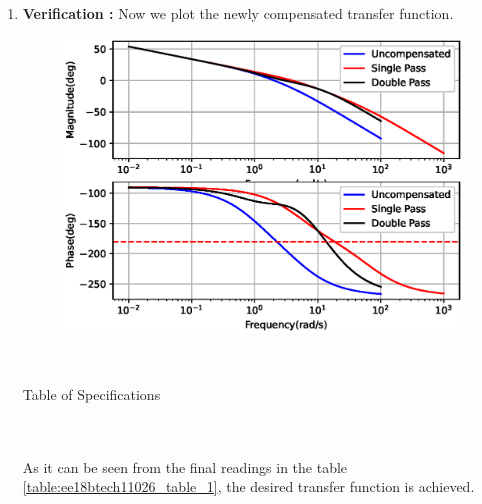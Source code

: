 \begin{enumerate}[label=\thesection.\arabic*.,ref=\thesection.\theenumi]
\item
\textbf{Verification : }
Now we plot the newly compensated transfer function.\\

\begin{figure}[!ht]
    \centering
    \includegraphics[width=\columnwidth]{./figs/ee18btech11051/ee18btech11051_fig3.eps}
    \label{fig:ee18btech11051_3}
\end{figure}

\\

\begin{table}[!ht]
\centering

\caption{Table of Specifications}
\label{table:ee18btech11026_table_1}
\end{table}
\\~\\

As it can be seen from the final readings in the table \ref{table:ee18btech11026_table_1}, the desired transfer function is achieved. 

\end{enumerate}
